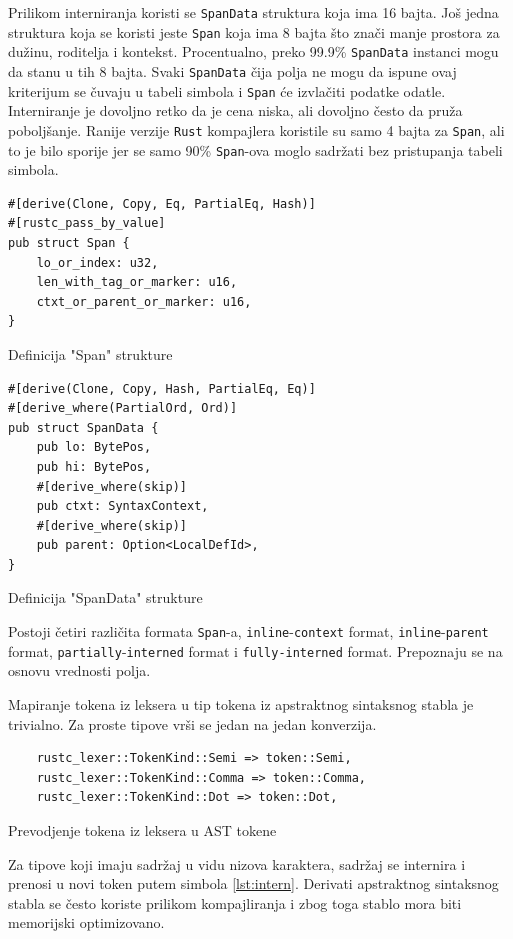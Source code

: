 \documentclass[11pt]{article}
\begin{document}
Prilikom interniranja koristi se \verb|SpanData| struktura koja ima 16 bajta. Još jedna struktura koja 
se koristi jeste \verb|Span| koja ima 8 bajta što znači manje prostora za dužinu, roditelja i kontekst. 
Procentualno, preko 99.9\%  \verb|SpanData| instanci mogu da stanu u tih 8 bajta. Svaki \verb|SpanData|
čija polja ne mogu da ispune ovaj kriterijum se čuvaju u tabeli simbola i \verb|Span| će izvlačiti podatke 
odatle. Interniranje je dovoljno retko da je cena niska, ali dovoljno često da pruža poboljšanje. 
Ranije verzije \verb|Rust| kompajlera koristile su samo 4 bajta za \verb|Span|, ali to je bilo sporije 
jer se samo 90\% \verb|Span|-ova moglo sadržati bez pristupanja tabeli simbola.

\begin{listing}[H]
\begin{verbatim}
#[derive(Clone, Copy, Eq, PartialEq, Hash)]
#[rustc_pass_by_value]
pub struct Span {
    lo_or_index: u32,
    len_with_tag_or_marker: u16,
    ctxt_or_parent_or_marker: u16,
}
\end{verbatim}
\caption{Definicija "Span" strukture}
\end{listing}


\begin{listing}[H]
\begin{verbatim}
#[derive(Clone, Copy, Hash, PartialEq, Eq)]
#[derive_where(PartialOrd, Ord)]
pub struct SpanData {
    pub lo: BytePos,
    pub hi: BytePos,
    #[derive_where(skip)]
    pub ctxt: SyntaxContext,
    #[derive_where(skip)]
    pub parent: Option<LocalDefId>,
}
\end{verbatim}
\caption{Definicija "SpanData" strukture}
\end{listing}

Postoji četiri različita formata \verb|Span|-a, \verb|inline|-\verb|context| format, \verb|inline|-\verb|parent| format,
\verb|partially|-\verb|interned| format i \verb|fully-interned| format.  Prepoznaju se na osnovu vrednosti polja.


Mapiranje tokena iz leksera u tip tokena iz apstraktnog sintaksnog stabla je trivialno.
Za proste tipove vrši se jedan na jedan konverzija.

\begin{listing}[H]
\begin{verbatim}
    rustc_lexer::TokenKind::Semi => token::Semi,
    rustc_lexer::TokenKind::Comma => token::Comma,
    rustc_lexer::TokenKind::Dot => token::Dot,
\end{verbatim}
\caption{Prevodjenje tokena iz leksera u AST tokene}
\end{listing}
Za tipove koji imaju sadržaj u vidu nizova karaktera, sadržaj se internira i prenosi 
u novi token putem simbola \ref{lst:intern}. Derivati apstraktnog sintaksnog stabla se često koriste prilikom kompajliranja i zbog toga 
stablo mora biti memorijski optimizovano.
\end{document}
